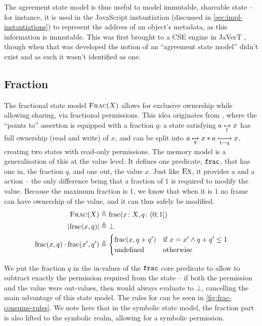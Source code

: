 The agreement state model is thus useful to model immutable, shareable state -- for instance, it is used in the JavaScript instantiation (discussed in \cref{sec:impl-instantiations}) to represent the address of an object's metadata, as this information is immutable. This was first brought to a CSE engine in JaVerT \cite{javert1,javert2}, though when that was developed the notion of an ``agreement state model'' didn't exist and as such it wasn't identified as one.

\subsection{Fraction}

The fractional state model $\textsc{Frac}(X)$ allows for exclusive ownership while allowing sharing, via fractional permissions. This idea originates from \cite{fracpermissions,fracpermissions2}, where the ``points to'' assertion is equipped with a fraction $q$: a state satisfying $a\mapstoq{1}x$ has full ownership (read and write) of $x$, and can be split into $a\mapstoq{q}x * a\mapstoq{1-q}x$, creating two states with read-only permissions. The \Frac{} memory model is a generalisation of this at the value level. It defines one predicate, $\texttt{frac}$, that has one in, the fraction $q$, and one out, the value $x$. Just like $\textsc{Ex}$, it provides a \load{} and a \store{} action -- the only difference being that a fraction of $1$ is required to modify the value. Because the maximum fraction is $1$, we know that when it is $1$ no frame can have ownership of the value, and it can thus safely be modified.
\begin{align*}
	\textsc{Frac}(X)&\triangleq \text{frac}(x\colon X, q\colon (0;1])\\
	|\text{frac}(x, q)| &\triangleq \bot\\
	\text{frac}(x,q)\cdot\text{frac}(x',q')&\triangleq \begin{cases}
		\text{frac}(x,q+q') & \text{if}~ x=x' \land q+q' \leq 1\\
		\text{undefined} &\text{otherwise}
	\end{cases}
\end{align*}

We put the fraction $q$ in the in-values of the $\texttt{frac}$ core predicate to allow \consume{} to subtract exactly the permission required from the state -- if both the permission and the value were out-values, then \consume{} would always evaluate to $\bot$, cancelling the main advantage of this state model. The rules for \consume{} can be seen in \autoref{fig:frac-consume-rules}. We note here that in the symbolic state model, the fraction part is also lifted to the symbolic realm, allowing for a symbolic permission.

